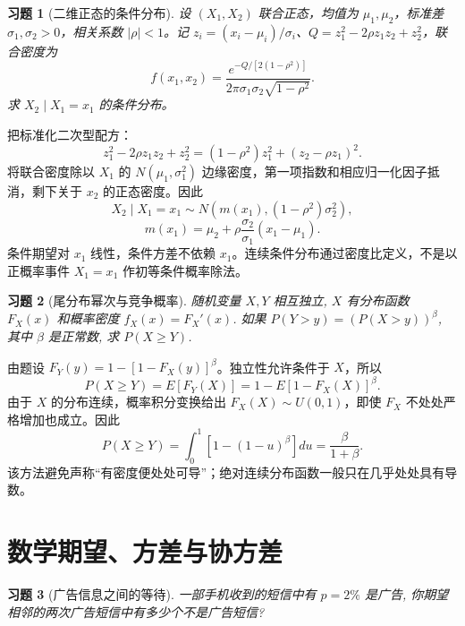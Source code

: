 \documentclass[UTF8,12pt,a4paper,fontset=fandol]{ctexart}
\newtheorem{exercise}{习题}[section]
\begin{document}
\begin{exercise}[二维正态的条件分布]\label{q:A4.28}
设 $(X_1,X_2)$ 联合正态，均值为 $\mu_1,\mu_2$，标准差 $\sigma_1,\sigma_2>0$，相关系数 $|\rho|<1$。记 $z_i=(x_i-\mu_i)/\sigma_i$、$Q=z_1^2-2\rho z_1z_2+z_2^2$，联合密度为\[f(x_1,x_2)=\frac{e^{-Q/[2(1-\rho^2)]}}{2\pi\sigma_1\sigma_2\sqrt{1-\rho^2}}.\]求 $X_2\mid X_1=x_1$ 的条件分布。\par{}
\end{exercise}

\begin{solve}\label{a:A4.28}把标准化二次型配方：\[z_1^2-2\rho z_1z_2+z_2^2=(1-\rho^2)z_1^2+(z_2-\rho z_1)^2.\]将联合密度除以 $X_1$ 的 $N(\mu_1,\sigma_1^2)$ 边缘密度，第一项指数和相应归一化因子抵消，剩下关于 $x_2$ 的正态密度。因此\[X_2\mid X_1=x_1\sim N(m(x_1),(1-\rho^2)\sigma_2^2),\]\[m(x_1)=\mu_2+\rho\frac{\sigma_2}{\sigma_1}(x_1-\mu_1).\]条件期望对 $x_1$ 线性，条件方差不依赖 $x_1$。连续条件分布通过密度比定义，不是以正概率事件 $X_1=x_1$ 作初等条件概率除法。\end{solve}

\begin{exercise}[尾分布幂次与竞争概率]\label{q:A4.32}
随机变量 $X,Y$ 相互独立, $X$ 有分布函数 $F_X(x)$ 和概率密度 $f_X(x)=F_X'(x)$. 如果 $P(Y>y)=(P(X>y))^\beta$, 其中 $\beta$ 是正常数, 求 $P(X\geq Y)$.\par{}
\end{exercise}

\begin{solve}\label{a:A4.32}由题设 $F_Y(y)=1-[1-F_X(y)]^\beta$。独立性允许条件于 $X$，所以\[P(X\ge Y)=E[F_Y(X)]=1-E[1-F_X(X)]^\beta.\]由于 $X$ 的分布连续，概率积分变换给出 $F_X(X)\sim U(0,1)$，即使 $F_X$ 不处处严格增加也成立。因此\[P(X\ge Y)=\int_0^1[1-(1-u)^\beta]du=\frac{\beta}{1+\beta}.\]该方法避免声称“有密度便处处可导”；绝对连续分布函数一般只在几乎处处具有导数。\end{solve}

\clearpage\section{数学期望、方差与协方差}

\begin{exercise}[广告信息之间的等待]\label{q:A5.5}
一部手机收到的短信中有 $p=2\%$ 是广告, 你期望相邻的两次广告短信中有多少个不是广告短信?\par{}
\end{exercise}
\end{document}
